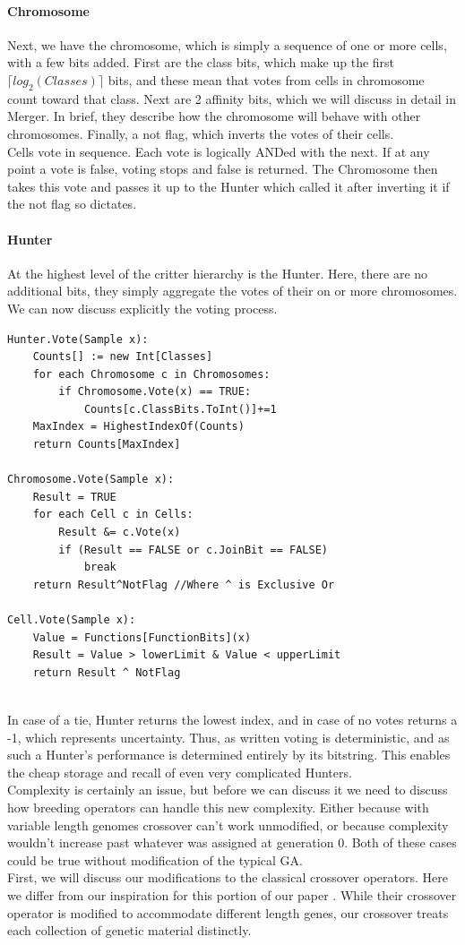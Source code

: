 \paragraph{Chromosome}
Next, we have the chromosome, which is simply a sequence of one or more cells, with a few bits added.  First are the class bits, which make up the first $\lceil log_2(Classes)\rceil$ bits, and these mean that votes from cells in chromosome count toward that class.  Next are 2 affinity bits, which we will discuss in detail in Merger.  In brief, they describe how the chromosome will behave with other chromosomes.  Finally, a not flag, which inverts the votes of their cells.\\
Cells vote in sequence.  Each vote is logically ANDed with the next.  If at any point a vote is false, voting stops and false is returned.  The Chromosome then takes this vote and passes it up to the Hunter which called it after inverting it if the not flag so dictates.
\paragraph{Hunter}
At the highest level of the critter hierarchy is the Hunter.  Here, there are no additional bits, they simply aggregate the votes of their on or more chromosomes.  We can now discuss explicitly the voting process.  
\begin{lstlisting}[language = algorithm]
Hunter.Vote(Sample x):
	Counts[] := new Int[Classes]
	for each Chromosome c in Chromosomes:
		if Chromosome.Vote(x) == TRUE:
			Counts[c.ClassBits.ToInt()]+=1
	MaxIndex = HighestIndexOf(Counts)
	return Counts[MaxIndex]
	
Chromosome.Vote(Sample x):
	Result = TRUE
	for each Cell c in Cells:
		Result &= c.Vote(x)
		if (Result == FALSE or c.JoinBit == FALSE) 
			break
	return Result^NotFlag //Where ^ is Exclusive Or
	
Cell.Vote(Sample x):
	Value = Functions[FunctionBits](x)
	Result = Value > lowerLimit & Value < upperLimit
	return Result ^ NotFlag
	 
\end{lstlisting}
In case of a tie, Hunter returns the lowest index, and in case of no votes returns a -1, which represents uncertainty.  Thus, as written voting is deterministic, and as such a Hunter's performance is determined entirely by its bitstring.  This enables the cheap storage and recall of even very complicated Hunters.\\
Complexity is certainly an issue, but before we can discuss it we need to discuss how breeding operators can handle this new complexity.  Either because with variable length genomes crossover can't work unmodified, or because complexity wouldn't increase past whatever was assigned at generation 0.  Both of these cases could be true without modification of the typical GA.\\
First, we will discuss our modifications to the classical crossover operators.  Here we differ from our inspiration for this portion of our paper \cite{kharma_project_2004}.  While their crossover operator is modified to accommodate different length genes, our crossover treats each collection of genetic material distinctly.\\
